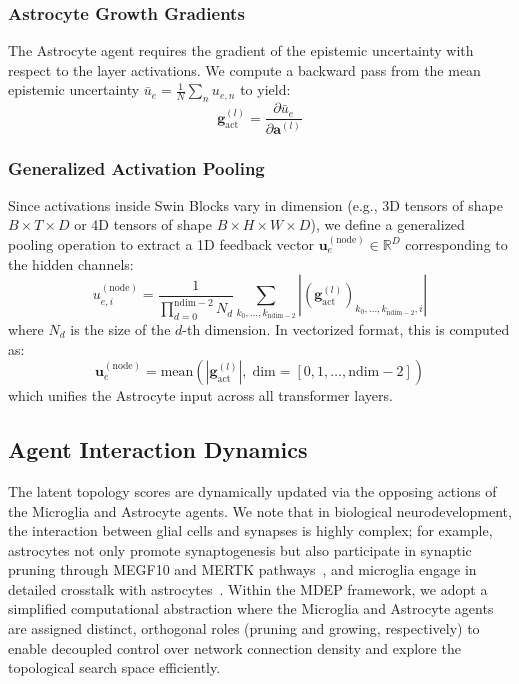\documentclass[11pt]{article}
\newcommand{\R}{\mathbb{R}}
\begin{document}
\subsubsection{Astrocyte Growth Gradients}

The Astrocyte agent requires the gradient of the epistemic uncertainty with respect to the layer activations. We compute a backward pass from the mean epistemic uncertainty $\bar{u}_e = \frac{1}{N}\sum_n u_{e,n}$ to yield:
\begin{equation}\label{eq:grad_ue}
    \bm{g}_{\text{act}}^{(l)} = \frac{\partial \bar{u}_e}{\partial \bm{a}^{(l)}}
\end{equation}

\subsubsection{Generalized Activation Pooling}

Since activations inside Swin Blocks vary in dimension (e.g., 3D tensors of shape $B \times T \times D$ or 4D tensors of shape $B \times H \times W \times D$), we define a generalized pooling operation to extract a 1D feedback vector $\bm{u}_e^{(\text{node})} \in \R^{D}$ corresponding to the hidden channels:
\begin{equation}\label{eq:node_pool}
    u_{e,i}^{(\text{node})} = \frac{1}{\prod_{d=0}^{\text{ndim}-2} N_d} \sum_{k_0, \dots, k_{\text{ndim}-2}} \left|\left(\bm{g}_{\text{act}}^{(l)}\right)_{k_0, \dots, k_{\text{ndim}-2}, i}\right|
\end{equation}
where $N_d$ is the size of the $d$-th dimension. In vectorized format, this is computed as:
\begin{equation}\label{eq:node_pool_code}
    \bm{u}_e^{(\text{node})} = \text{mean}\!\left(\left|\bm{g}_{\text{act}}^{(l)}\right|,\; \text{dim} = [0, 1, \dots, \text{ndim}-2]\right)
\end{equation}
which unifies the Astrocyte input across all transformer layers.

\subsection{Agent Interaction Dynamics}\label{subsec:agents}

The latent topology scores are dynamically updated via the opposing actions of the Microglia and Astrocyte agents. We note that in biological neurodevelopment, the interaction between glial cells and synapses is highly complex; for example, astrocytes not only promote synaptogenesis but also participate in synaptic pruning through MEGF10 and MERTK pathways~\cite{chung2013astrocytes}, and microglia engage in detailed crosstalk with astrocytes~\cite{vainchtein2018astrocyte}. Within the MDEP framework, we adopt a simplified computational abstraction where the Microglia and Astrocyte agents are assigned distinct, orthogonal roles (pruning and growing, respectively) to enable decoupled control over network connection density and explore the topological search space efficiently.
\end{document}
